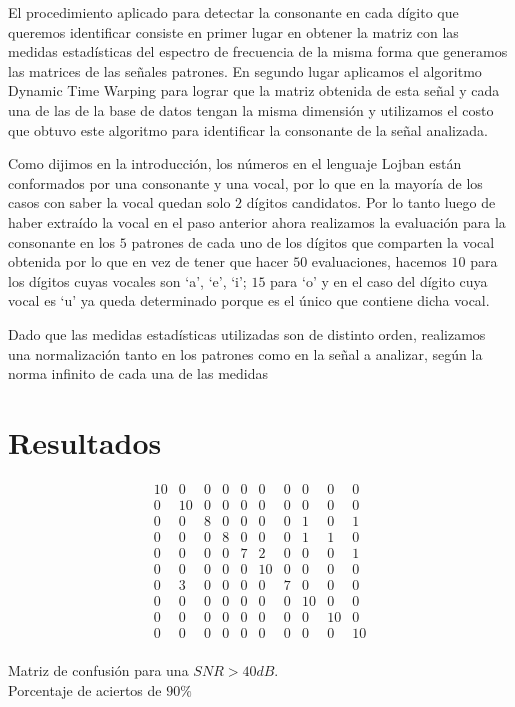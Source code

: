 \documentclass[conference,a4paper,10pt,oneside,final]{tfmpd}
\begin{document}
		El procedimiento aplicado para detectar la consonante en cada dígito que
		queremos identificar consiste en primer lugar en obtener la matriz con
		las medidas estadísticas del espectro de frecuencia de la misma forma
		que generamos las matrices de las señales patrones. En segundo lugar
		aplicamos el algoritmo Dynamic Time Warping \cite{Senin} para lograr que la matriz
		obtenida de esta señal y cada una de las de la base de datos tengan la
		misma dimensión  y utilizamos el costo que obtuvo este algoritmo para
		identificar la consonante de la señal analizada.

		Como dijimos en la introducción, los números en el lenguaje Lojban
		están conformados por una consonante y una vocal, por lo que en
		la mayoría de los casos con saber la vocal quedan solo $2$ dígitos
		candidatos. Por lo tanto luego de haber extraído la vocal en el paso
		anterior ahora realizamos la evaluación para la consonante en los $5$
		patrones de cada uno de los dígitos que comparten la vocal obtenida por
		lo que en vez de tener que hacer $50$ evaluaciones, hacemos $10$ para los
		dígitos cuyas vocales son `a', `e', `i'; $15$ para `o' y en el caso del dígito
		cuya vocal es `u' ya queda determinado porque es el único que contiene
		dicha vocal.

		Dado que las medidas estadísticas utilizadas son de distinto
		orden, realizamos una normalización tanto en los patrones como
		en la señal a analizar, según la norma infinito de cada una
		de las medidas


\section{Resultados}
	\begin{table}
	\[
		\begin{array}{cccccccccc}
10 & 0 & 0 & 0 & 0 & 0 & 0 & 0 & 0 & 0 \\
0 & 10 & 0 & 0 & 0 & 0 & 0 & 0 & 0 & 0 \\
0 & 0 & 8 & 0 & 0 & 0 & 0 & 1 & 0 & 1 \\
0 & 0 & 0 & 8 & 0 & 0 & 0 & 1 & 1 & 0 \\
0 & 0 & 0 & 0 & 7 & 2 & 0 & 0 & 0 & 1 \\
0 & 0 & 0 & 0 & 0 & 10 & 0 & 0 & 0 & 0 \\
0 & 3 & 0 & 0 & 0 & 0 & 7 & 0 & 0 & 0 \\
0 & 0 & 0 & 0 & 0 & 0 & 0 & 10 & 0 & 0 \\
0 & 0 & 0 & 0 & 0 & 0 & 0 & 0 & 10 & 0 \\
0 & 0 & 0 & 0 & 0 & 0 & 0 & 0 & 0 & 10 \\
		\end{array}
	\]
		\caption{Matriz de confusión para una $SNR > 40dB$.\\
		Porcentaje de aciertos de $90\%$}
		\label{infty}
	\end{table}
\end{document}
